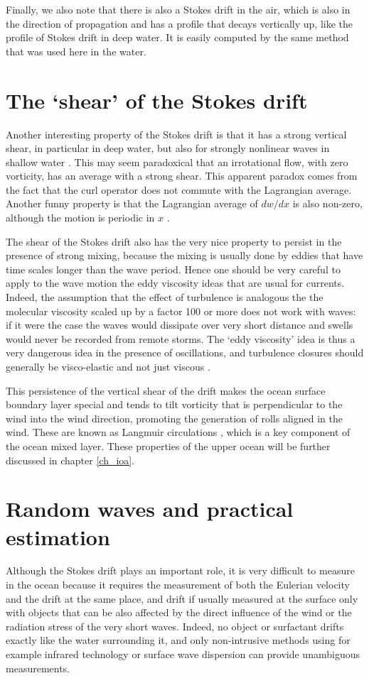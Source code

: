 Finally, we also note that there is also a Stokes drift in the air, which is also in the direction of propagation 
and has a profile that decays vertically up, like the profile of Stokes drift in deep water. It is easily 
computed by the same method that was used here in the water. 

\section{The `shear' of the Stokes drift}
Another interesting property of the Stokes drift is that it has a strong vertical shear, in particular in deep water, but also 
for strongly nonlinear waves in shallow water \citep{Miche1944d}. This may seem paradoxical that an irrotational flow, with zero vorticity, has an average with a strong shear. This apparent paradox comes from the fact that the curl operator does 
not commute with the Lagrangian average. Another funny property is that the Lagrangian average of $dw/dx$ is also non-zero, 
although the motion is periodic in $x$ \citep{Ardhuin&Jenkins2006}.

The shear of the Stokes drift also has the very nice property to persist in the presence of strong mixing, because the mixing is usually done by eddies that have time scales longer than the wave period. Hence one should be very careful to apply to the wave motion the eddy viscosity ideas that are usual for currents. Indeed, the assumption that the effect of turbulence is analogous the the molecular viscosity scaled up by a factor 100 or more does not work with waves: if it were the case the waves would dissipate over very short distance and swells would never be recorded from remote storms. 
The `eddy viscosity' idea is thus a very dangerous idea in the presence of oscillations, and turbulence closures should generally be visco-elastic and not just viscous \citep[e.g.][]{Miles1996b}. 

This persistence of the vertical shear of the drift makes the ocean surface boundary layer special and tends to tilt vorticity that is perpendicular to the wind into the wind direction, promoting the generation of rolls aligned in the wind. 
These are known as Langmuir circulations \citep{Langmuir1938}, which is a key component of the ocean mixed layer. 
These properties of the upper ocean will be further discussed in chapter \ref{ch_ioa}.

\section{Random waves and practical estimation}
Although the Stokes drift plays an important role, it is very difficult to measure in the ocean because it requires the measurement of both the Eulerian velocity and the drift at the same place, and drift if usually measured at the surface only with objects that can be also affected by the direct influence of the wind or the radiation stress of the very short waves. Indeed, no object or surfactant drifts exactly like the water surrounding it, and only non-intrusive methods using for example infrared technology \citep{Veron&al.2008} or surface wave dispersion \citep{Laxague&al.2018} can provide unambiguous measurements.

